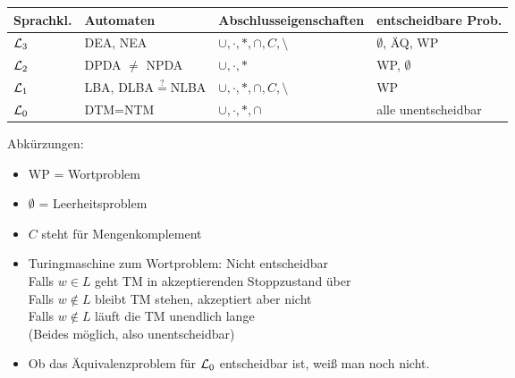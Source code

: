 \begin{tabular}{l|l|l|l}
	Sprachkl. & Automaten & Abschlusseigenschaften & entscheidbare Prob.\\ \hline
	$\mathcal{L}_3$ & DEA, NEA & $\cup,\cdot,\ast,\cap,C,\setminus$ & $\emptyset$, ÄQ, WP \\
	$\mathcal{L}_2$ & DPDA $\neq$ NPDA & $\cup,\cdot,\ast$ & WP, $\emptyset$\\
	$\mathcal{L}_1$ & LBA, DLBA$\overset{?}{=}$NLBA & $\cup,\cdot,\ast,\cap,C,\setminus$ & WP\\
	$\mathcal{L}_0$ & DTM=NTM & $\cup,\cdot,\ast,\cap$ & alle unentscheidbar\\ 
\end{tabular}

Abkürzungen:
\begin{itemize}
	\item WP = Wortproblem
	\item $\emptyset$ = Leerheitsproblem
	\item $C$ steht für Mengenkomplement
\end{itemize}

\begin{itemize}
	\item Turingmaschine zum Wortproblem: Nicht entscheidbar\\
	Falls $w\in L$ geht TM in akzeptierenden Stoppzustand über\\
	Falls $w\not\in L$ bleibt TM stehen, akzeptiert aber nicht\\
	Falls $w\not\in L$ läuft die TM unendlich lange\\
	(Beides möglich, also unentscheidbar)
	\item Ob das Äquivalenzproblem für $\mathcal{L}_0$ entscheidbar ist, weiß man noch nicht.
\end{itemize}